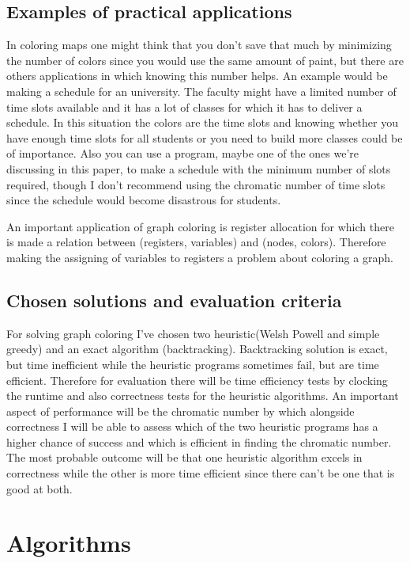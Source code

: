 \documentclass[runningheads]{llncs}
\begin{document}
\subsection{Examples of practical applications}
In coloring maps one might think that you don't save that much by
minimizing the number of colors since you would use the same amount of paint, but there are others
applications in which knowing this number helps. An example would be making a schedule for an university.
The faculty might have a limited number of time slots available and it has a lot of classes for which it
has to deliver a schedule. In this situation the colors are the time slots and knowing whether you have
enough time slots for all students or you need to build more classes could be of importance. Also you
can use a program, maybe one of the ones we're discussing in this paper, to make a schedule with the minimum
number of slots required, though I don't recommend using the chromatic number of time slots since the
schedule would become disastrous for students.

An important application of graph coloring is register allocation for which there is made a relation
between (registers, variables) and (nodes, colors). Therefore making the assigning of variables to
registers a problem about coloring a graph. \cite{ref_url5}

\subsection{Chosen solutions and evaluation criteria}
For solving graph coloring I've chosen two heuristic(Welsh Powell and simple greedy) and an exact algorithm
(backtracking). Backtracking solution is exact, but time inefficient while the heuristic programs sometimes
fail, but are time efficient. Therefore for evaluation there will be time efficiency tests by clocking the
runtime and also correctness tests for the heuristic algorithms. An important aspect of performance will
be the chromatic number by which alongside correctness I will be able to assess which of the two heuristic
programs has a higher chance of success and which is efficient in finding the chromatic number. The most
probable outcome will be that one heuristic algorithm excels in correctness while the other is more time
efficient since there can't be one that is good at both.
\section{Algorithms}
\end{document}
